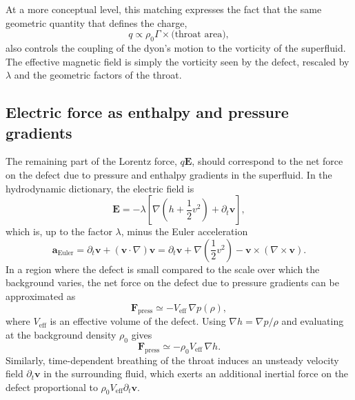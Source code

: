 \documentclass[11pt]{article}
\begin{document}
At a more conceptual level, this matching expresses the fact that the same geometric quantity that defines the charge,
\begin{equation}
q \propto \rho_0 \Gamma \times \text{(throat area)},
\end{equation}
also controls the coupling of the dyon's motion to the vorticity of the superfluid.  The effective magnetic field is simply the vorticity seen by the defect, rescaled by $\lambda$ and the geometric factors of the throat.

\subsection{Electric force as enthalpy and pressure gradients}

The remaining part of the Lorentz force, $q\mathbf{E}$, should correspond to the net force on the defect due to pressure and enthalpy gradients in the superfluid.  In the hydrodynamic dictionary, the electric field is
\begin{equation}
\mathbf{E}
= -\lambda\left[\nabla\left(h + \frac{1}{2}v^2\right) + \partial_t \mathbf{v}\right],
\end{equation}
which is, up to the factor $\lambda$, minus the Euler acceleration
\begin{equation}
\mathbf{a}_{\mathrm{Euler}}
= \partial_t \mathbf{v} + (\mathbf{v}\cdot\nabla)\mathbf{v}
= \partial_t \mathbf{v} + \nabla\left(\frac{1}{2}v^2\right) - \mathbf{v}\times(\nabla\times\mathbf{v}).
\end{equation}
In a region where the defect is small compared to the scale over which the background varies, the net force on the defect due to pressure gradients can be approximated as
\begin{equation}
\mathbf{F}_{\mathrm{press}}
\simeq -V_{\mathrm{eff}}\,\nabla p(\rho),
\label{eq:F-press}
\end{equation}
where $V_{\mathrm{eff}}$ is an effective volume of the defect.  Using $\nabla h = \nabla p / \rho$ and evaluating at the background density $\rho_0$ gives
\begin{equation}
\mathbf{F}_{\mathrm{press}}
\simeq -\rho_0 V_{\mathrm{eff}}\,\nabla h.
\end{equation}
Similarly, time-dependent breathing of the throat induces an unsteady velocity field $\partial_t \mathbf{v}$ in the surrounding fluid, which exerts an additional inertial force on the defect proportional to $\rho_0 V_{\mathrm{eff}} \partial_t \mathbf{v}$.
\end{document}
